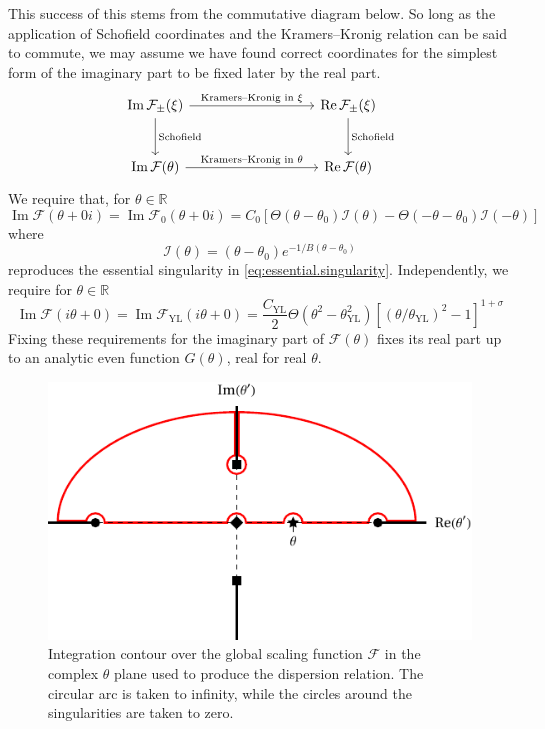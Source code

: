 \documentclass[
aps,
pre,
preprint,
longbibliography,
floatfix
]{revtex4-2}
\begin{document}
This success of this stems from the commutative diagram below. So long as the
application of Schofield coordinates and the Kramers--Kronig relation can be
said to commute, we may assume we have found correct coordinates for the
simplest form of the imaginary part to be fixed later by the real part.
\[
  \begin{tikzcd}[row sep=large, column sep = 9em]
  \operatorname{Im}\mathcal F_\pm(\xi) \arrow{r}{\text{Kramers--Kronig in $\xi$}} \arrow[]{d}{\text{Schofield}} & \operatorname{Re}\mathcal F_{\pm}(\xi) \arrow{d}{\text{Schofield}} \\%
  \operatorname{Im}\mathcal F(\theta) \arrow{r}{\text{Kramers--Kronig in $\theta$}}& \operatorname{Re}\mathcal F(\theta)
\end{tikzcd}
\]
We require that, for $\theta\in\mathbb R$
\begin{equation} \label{eq:imaginary.abrupt}
  \operatorname{Im}\mathcal F(\theta+0i)=\operatorname{Im}\mathcal F_0(\theta+0i)=C_0[\Theta(\theta-\theta_0)\mathcal I(\theta)-\Theta(-\theta-\theta_0)\mathcal I(-\theta)]
\end{equation}
where
\begin{equation}
  \mathcal I(\theta)=(\theta-\theta_0)e^{-1/B(\theta-\theta_0)}
\end{equation}
reproduces the essential singularity in \eqref{eq:essential.singularity}.
Independently, we require for $\theta\in\mathbb R$
\begin{equation}
  \operatorname{Im}\mathcal F(i\theta+0)=\operatorname{Im}\mathcal F_\mathrm{YL}(i\theta+0)=\frac{C_\mathrm{YL}}2\Theta(\theta^2-\theta_\mathrm{YL}^2)[(\theta/\theta_\mathrm{YL})^2-1]^{1+\sigma}
\end{equation}
Fixing these requirements for the imaginary part of $\mathcal F(\theta)$ fixes
its real part up to an analytic even function $G(\theta)$, real for real $\theta$.

\begin{figure}
  \includegraphics{figs/contour_path.pdf}
  \caption{
    Integration contour over the global scaling function $\mathcal F$ in the
    complex $\theta$ plane used to produce the dispersion relation. The
    circular arc is taken to infinity, while the circles around the
    singularities are taken to zero.
  } \label{fig:contour}
\end{figure}
\end{document}

